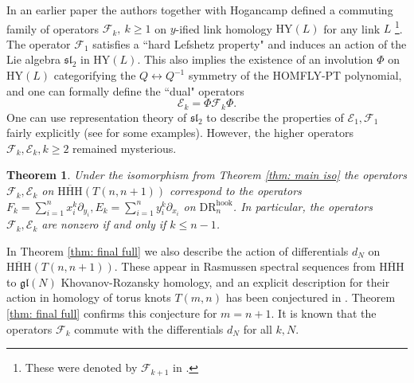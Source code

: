 \documentclass{amsart}
\newcommand{\DR}{\mathrm{DR}}
\newcommand{\HY}{\mathrm{HY}}
\newcommand{\CE}{\mathcal{E}}
\newcommand{\CF}{\mathcal{F}}
\newcommand{\HHH}{\mathrm{HHH}}
\newcommand{\hook}{\mathrm{hook}}
\numberwithin{equation}{section}
\newtheorem{theorem}{Theorem}[section]
\theoremstyle{definition}
\begin{document}
In an earlier paper \cite{GHM} the authors together with Hogancamp defined a commuting family of operators $\CF_k,\ k\ge 1$  on $y$-ified link homology $\HY(L)$ for any link $L$ \footnote{These were denoted by $\CF_{k+1}$ in \cite{GHM}.}.  The operator $\CF_1$ satisfies a ``hard Lefshetz property" and induces an action of the Lie algebra $\mathfrak{sl}_2$ in $\HY(L)$. This also implies the existence of an involution $\Phi$ on $\HY(L)$ categorifying the $Q\leftrightarrow Q^{-1}$ symmetry of the HOMFLY-PT polynomial, and one can formally define the ``dual" operators
$$
\CE_k=\Phi\CF_k\Phi.
$$
One can use representation theory of $\mathfrak{sl}_2$ to describe the properties of $\CE_1,\CF_1$ fairly explicitly (see \cite{CG} for some examples).
However, the higher operators $\CF_k,\CE_k, k
\ge 2$ remained mysterious.

\begin{theorem}
\label{thm: main tautol}
Under the isomorphism from Theorem \ref{thm: main iso} the operators $\CF_k,\CE_k$ on $\overline{\HHH}(T(n,n+1))$ correspond to the operators $F_k=\sum_{i=1}^{n}x_i^k\partial_{y_i}, E_k=\sum_{i=1}^{n}y_i^k\partial_{x_i}$ on $\DR_n^{\hook}$.
In particular, the operators $\CF_k,\CE_k$ are nonzero if and only if $k\le n-1$.
\end{theorem}

In Theorem \ref{thm: final full} we also describe the action of differentials $d_N$ on $\overline{\HHH}(T(n,n+1))$. These appear in   Rasmussen spectral sequences \cite{Rasmussen} from $\overline{\HHH}$ to $\mathfrak{gl}(N)$ Khovanov-Rozansky homology, and an explicit description for their action in homology of torus knots $T(m,n)$ has been conjectured in \cite{GORS}. Theorem \ref{thm: final full} confirms this conjecture for $m=n+1$. It is known  that the operators $\CF_k$ commute with the differentials $d_N$ for all $k,N$.
\end{document}
